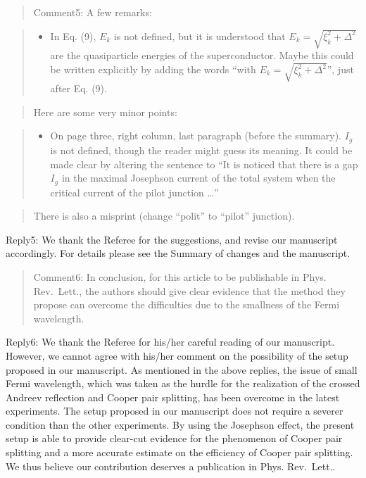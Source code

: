 \documentclass[11pt]{article}
\providecommand{\tightlist}{%
      \setlength{\itemsep}{0pt}\setlength{\parskip}{0pt}}
\begin{document}
\begin{quote}
Comment5: A few remarks:
\end{quote}

\begin{quote}
\begin{itemize}
\tightlist
\item
  In Eq. (9), \(E_k\) is not defined, but it is understood that
  \(E_k = \sqrt{\xi_k^2 + \Delta^2}\) are the quasiparticle energies of
  the superconductor. Maybe this could be written explicitly by adding
  the words ``with \(E_k = \sqrt{\xi_k^2 + \Delta^2}\)'', just after Eq.
  (9).
\end{itemize}
\end{quote}

\begin{quote}
Here are some very minor points:
\end{quote}

\begin{quote}
\begin{itemize}
\tightlist
\item
  On page three, right column, last paragraph (before the summary).
  \(I_g\) is not defined, though the reader might guess its meaning. It
  could be made clear by altering the sentence to ``It is noticed that
  there is a gap \(I_g\) in the maximal Josephson current of the total
  system when the critical current of the pilot junction \ldots{}''
\end{itemize}
\end{quote}

\begin{quote}
There is also a misprint (change ``polit'' to ``pilot'' junction).
\end{quote}

Reply5: We thank the Referee for the suggestions, and revise our
manuscript accordingly. For details please see the Summary of changes
and the manuscript.

\begin{quote}
Comment6: In conclusion, for this article to be publishable in Phys.
Rev.~Lett., the authors should give clear evidence that the method they
propose can overcome the difficulties due to the smallness of the Fermi
wavelength.
\end{quote}

Reply6: We thank the Referee for his/her careful reading of our
manuscript. However, we cannot agree with his/her comment on the
possibility of the setup proposed in our manuscript. As mentioned in the
above replies, the issue of small Fermi wavelength, which was taken as
the hurdle for the realization of the crossed Andreev reflection and
Cooper pair splitting, has been overcome in the latest experiments. The
setup proposed in our manuscript does not require a severer condition
than the other experiments. By using the Josephson effect, the present
setup is able to provide clear-cut evidence for the phenomenon of Cooper
pair splitting and a more accurate estimate on the efficiency of Cooper
pair splitting. We thus believe our contribution deserves a publication
in Phys. Rev.~Lett..
\end{document}
